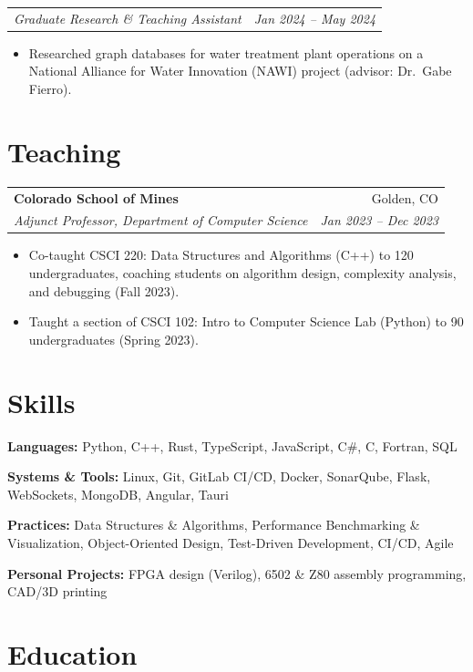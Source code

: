 \documentclass[letterpaper,10pt]{article}
\makeatletter
\newcommand{\entry}[4]{%
  \begin{tabularx}{\linewidth}{@{}X r@{}}
    \textbf{#1} & #2 \\
    \textit{#3} & \textit{\small #4} \\
  \end{tabularx}\vspace{-2pt}%
}
\newcommand{\subentry}[2]{%
  \begin{tabularx}{\linewidth}{@{}X r@{}}
    \textit{#1} & \textit{\small #2} \\
  \end{tabularx}\vspace{-2pt}%
}
\newcommand{\skillrow}[2]{\textbf{#1:} #2\par\vspace{1pt}}
\makeatother
\begin{document}
\subentry{Graduate Research \& Teaching Assistant}{Jan 2024 -- May 2024}
\begin{itemize}
  \item Researched graph databases for water treatment plant operations on a National Alliance for Water
        Innovation (NAWI) project (advisor: Dr.\ Gabe Fierro).
\end{itemize}

\section{Teaching}

\entry{Colorado School of Mines}{Golden, CO}{Adjunct Professor, Department of Computer Science}{Jan 2023 -- Dec 2023}
\begin{itemize}
  \item Co-taught CSCI 220: Data Structures and Algorithms (C++) to 120 undergraduates, coaching students on
        algorithm design, complexity analysis, and debugging (Fall 2023).
  \item Taught a section of CSCI 102: Intro to Computer Science Lab (Python) to 90 undergraduates (Spring 2023).
\end{itemize}

\section{Skills}
\skillrow{Languages}{Python, C++, Rust, TypeScript, JavaScript, C\#, C, Fortran, SQL}
\skillrow{Systems \& Tools}{Linux, Git, GitLab CI/CD, Docker, SonarQube, Flask, WebSockets, MongoDB, Angular, Tauri}
\skillrow{Practices}{Data Structures \& Algorithms, Performance Benchmarking \& Visualization, Object-Oriented Design,
  Test-Driven Development, CI/CD, Agile}
\skillrow{Personal Projects}{FPGA design (Verilog), 6502 \& Z80 assembly programming, CAD/3D printing}

\section{Education}
\end{document}
